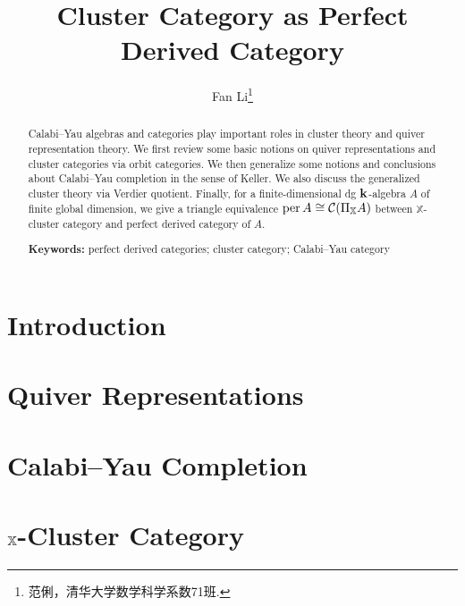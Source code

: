 \documentclass[twoside]{article}
\begin{document}
\title{Cluster Category as Perfect Derived Category}
\author{Fan Li\footnote{范俐，清华大学数学科学系数71班.}}
\begin{abstract}
  Calabi--Yau algebras and categories play important roles in cluster theory
  and quiver representation theory.
  We first review some basic notions on
  quiver representations and cluster categories via orbit categories.
  We then generalize some notions and conclusions about Calabi--Yau completion
  in the sense of Keller.
  We also discuss the generalized cluster theory via Verdier quotient.
  Finally, for a finite-dimensional dg $\mathbf{k}$-algebra $A$ of finite global dimension,
  we give a triangle equivalence $\operatorname{per} A \cong \operatorname{\mathcal{C}}(\Pi_{\mathbb{X}}A)$ between
  $\mathbb{X}$-cluster category and perfect derived category of $A$.

  \bigskip
  \noindent
  \textbf{Keywords:}
  perfect derived categories; cluster category; Calabi--Yau category
\end{abstract}

\tableofcontents

\section{Introduction}


\section{Quiver Representations}


\section{Calabi--Yau Completion}


\section{\texorpdfstring{$\mathbb{X}$}{X}-Cluster Category}


\printbibliography
\end{document}
